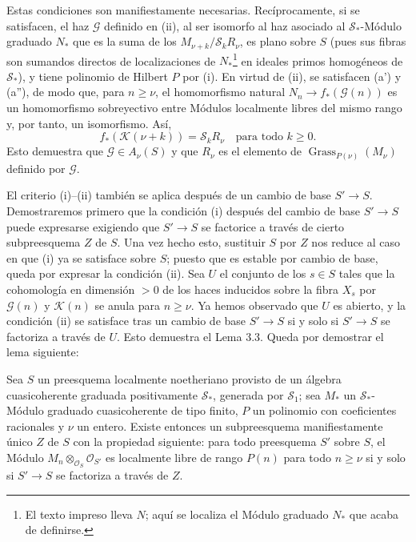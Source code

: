 Estas condiciones son manifiestamente necesarias. Recíprocamente, si se
satisfacen, el haz $\mathcal G$ definido en (ii), al ser isomorfo al haz
asociado al $\mathcal S_*$-Módulo graduado $N_*$ que es la suma de los
$M_{\nu+k}/\mathcal S_kR_\nu$, es plano sobre $S$ (pues sus fibras son
sumandos directos de localizaciones de $N_*$\footnote{El texto impreso lleva $N$; aquí se localiza el Módulo graduado $N_*$ que acaba de definirse.} en ideales primos homogéneos de
$\mathcal S_*$), y tiene polinomio de Hilbert $P$ por (i). En virtud de (ii),
se satisfacen (a') y (a''), de modo que, para $n\geq\nu$, el homomorfismo
natural $N_n\longrightarrow f_*(\mathcal G(n))$ es un homomorfismo
sobreyectivo entre Módulos localmente libres del mismo rango y, por tanto, un
isomorfismo. Así,
\[
f_*(\mathcal K(\nu+k))=\mathcal S_kR_\nu
\quad\text{para todo $k\geq0$}.
\]
Esto demuestra que $\mathcal G\in A_\nu(S)$ y que $R_\nu$ es el elemento de
$\operatorname{Grass}_{P(\nu)}(M_\nu)$ definido por $\mathcal G$.

El criterio (i)--(ii) también se aplica después de un cambio de base
$S'\longrightarrow S$. Demostraremos primero que la condición (i) después del
cambio de base $S'\longrightarrow S$ puede expresarse exigiendo que
$S'\longrightarrow S$ se factorice a través de cierto subpreesquema $Z$ de
$S$. Una vez hecho esto, sustituir $S$ por $Z$ nos reduce al caso en que (i) ya
se satisface sobre $S$; puesto que es estable por cambio de base, queda por
expresar la condición (ii). Sea $U$ el conjunto de los $s\in S$ tales que la
cohomología en dimensión $>0$ de los haces inducidos sobre la fibra $X_s$ por
$\mathcal G(n)$ y $\mathcal K(n)$ se anula para $n\geq\nu$. Ya hemos observado
que $U$ es abierto, y la condición (ii) se satisface tras un cambio de base
$S'\longrightarrow S$ si y solo si $S'\longrightarrow S$ se factoriza a
través de $U$. Esto demuestra el Lema 3.3. Queda por demostrar el lema
siguiente:

 Sea $S$ un preesquema localmente noetheriano provisto de un
álgebra cuasicoherente graduada positivamente $\mathcal S_*$, generada por
$\mathcal S_1$; sea $M_*$ un $\mathcal S_*$-Módulo graduado cuasicoherente de
tipo finito, $P$ un polinomio con coeficientes racionales y $\nu$ un entero.
Existe entonces un subpreesquema manifiestamente único $Z$ de $S$
con la propiedad siguiente: para todo preesquema $S'$ sobre $S$, el Módulo
$M_n\otimes_{\mathcal O_S}\mathcal O_{S'}$ es localmente libre de rango $P(n)$
para todo $n\geq\nu$ si y solo si $S'\longrightarrow S$ se factoriza a través
de $Z$.


